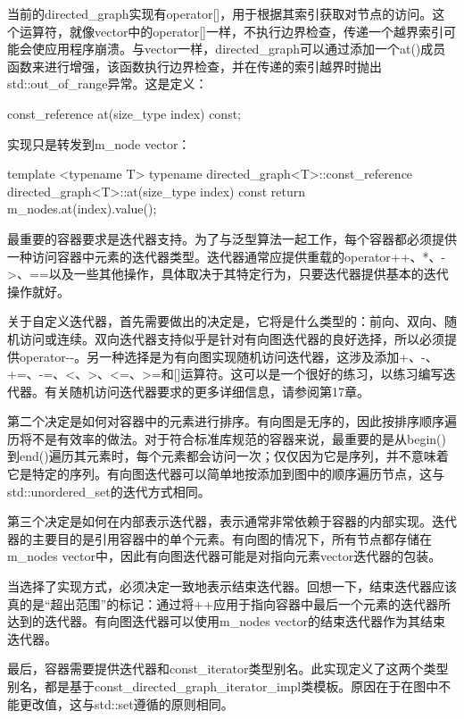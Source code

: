 当前的directed\_graph实现有operator[]，用于根据其索引获取对节点的访问。这个运算符，就像vector中的operator[]一样，不执行边界检查，传递一个越界索引可能会使应用程序崩溃。与vector一样，directed\_graph可以通过添加一个at()成员函数来进行增强，该函数执行边界检查，并在传递的索引越界时抛出std::out\_of\_range异常。这是定义：

\begin{cpp}
const_reference at(size_type index) const;
\end{cpp}

实现只是转发到m\_node vector：

\begin{cpp}
template <typename T>
typename directed_graph<T>::const_reference
    directed_graph<T>::at(size_type index) const
{
    return m_nodes.at(index).value();
}
\end{cpp}


最重要的容器要求是迭代器支持。为了与泛型算法一起工作，每个容器都必须提供一种访问容器中元素的迭代器类型。迭代器通常应提供重载的operator++、*、->、==以及一些其他操作，具体取决于其特定行为，只要迭代器提供基本的迭代操作就好。

关于自定义迭代器，首先需要做出的决定是，它将是什么类型的：前向、双向、随机访问或连续。双向迭代器支持似乎是针对有向图迭代器的良好选择，所以必须提供operator-{}-。另一种选择是为有向图实现随机访问迭代器，这涉及添加+、-、+=、-=、<、>、<=、>=和[]运算符。这可以是一个很好的练习，以练习编写迭代器。有关随机访问迭代器要求的更多详细信息，请参阅第17章。

第二个决定是如何对容器中的元素进行排序。有向图是无序的，因此按排序顺序遍历将不是有效率的做法。对于符合标准库规范的容器来说，最重要的是从begin()到end()遍历其元素时，每个元素都会访问一次；仅仅因为它是序列，并不意味着它是特定的序列。有向图迭代器可以简单地按添加到图中的顺序遍历节点，这与std::unordered\_set的迭代方式相同。

第三个决定是如何在内部表示迭代器，表示通常非常依赖于容器的内部实现。迭代器的主要目的是引用容器中的单个元素。有向图的情况下，所有节点都存储在m\_nodes vector中，因此有向图迭代器可能是对指向元素vector迭代器的包装。

当选择了实现方式，必须决定一致地表示结束迭代器。回想一下，结束迭代器应该真的是“超出范围”的标记：通过将++应用于指向容器中最后一个元素的迭代器所达到的迭代器。有向图迭代器可以使用m\_nodes vector的结束迭代器作为其结束迭代器。

最后，容器需要提供迭代器和const\_iterator类型别名。此实现定义了这两个类型别名，都是基于const\_directed\_graph\_iterator\_impl类模板。原因在于在图中不能更改值，这与std::set遵循的原则相同。

